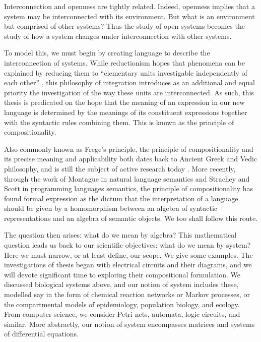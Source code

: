 Interconnection and openness are tightly related. Indeed, openness implies that
a system may be interconnected with its environment. But what is an environment
but comprised of other systems? Thus the study of open systems becomes the study
of how a system changes under interconnection with other systems.

To model this, we must begin by creating language to describe the
interconnection of systems. While reductionism hopes that phenomena can be
explained by reducing them to ``elementary units investigable independently of
each other'' \cite{Ber68}, this philosophy of integration introduces as an
additional and equal priority the investigation of the way these units are
interconnected. As such, this thesis is predicated on the hope that the meaning
of an expression in our new language is determined by the meanings of its
constituent expressions together with the syntactic rules combining them. This
is known as the principle of compositionality. 

Also commonly known as Frege's principle, the principle of compositionality and
its precise meaning and applicability both dates back to Ancient Greek and Vedic
philosophy, and is still the subject of active research today
\cite{Jan86,Sza13}. More recently, through the work of Montague \cite{Mon70} in
natural language semantics and Strachey and Scott \cite{SS71} in programming
languages semantics, the principle of compositionality has found formal
expression as the dictum that the interpretation of a language should be given
by a homomorphism between an algebra of syntactic representations and an algebra
of semantic objects. We too shall follow this route.

The question then arises: what do we mean by algebra? This mathematical question
leads us back to our scientific objectives: what do we mean by system? Here we
must narrow, or at least define, our scope. We give some examples. The
investigations of thesis began with electrical circuits and their diagrams, and
we will devote significant time to exploring their compositional formulation. We
discussed biological systems above, and our notion of system includes these,
modelled say in the form of chemical reaction networks or Markov processes, or
the compartmental models of epidemiology, population biology, and ecology. From
computer science, we consider Petri nets, automata, logic circuits, and similar.
More abstractly, our notion of system encompasses matrices and systems of
differential equations. 

